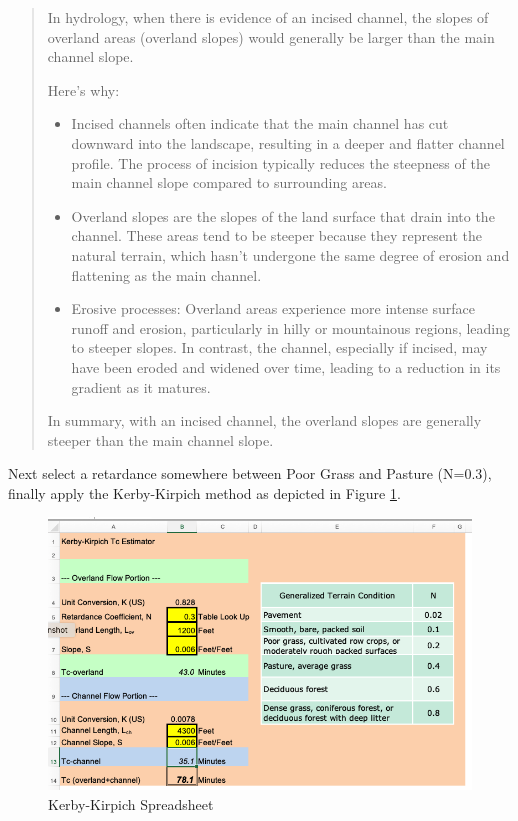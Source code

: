 \documentclass[12pt]{article}
\begin{document}
\begin{enumerate}
\begin{quote}
In hydrology, when there is evidence of an incised channel, the slopes of overland areas (overland slopes) would generally be larger than the main channel slope.

Here's why:

\begin{itemize}
\item Incised channels often indicate that the main channel has cut downward into the landscape, resulting in a deeper and flatter channel profile. The process of incision typically reduces the steepness of the main channel slope compared to surrounding areas.
\item Overland slopes are the slopes of the land surface that drain into the channel. These areas tend to be steeper because they represent the natural terrain, which hasn't undergone the same degree of erosion and flattening as the main channel.
\item Erosive processes: Overland areas experience more intense surface runoff and erosion, particularly in hilly or mountainous regions, leading to steeper slopes. In contrast, the channel, especially if incised, may have been eroded and widened over time, leading to a reduction in its gradient as it matures.
\end{itemize}
In summary, with an incised channel, the overland slopes are generally steeper than the main channel slope.
\end{quote}

Next select a retardance somewhere between Poor Grass and Pasture (N=0.3), finally apply the Kerby-Kirpich method as depicted in Figure \ref{fig:kerby}.

\begin{figure}[h!] %
   \centering
   \includegraphics[width=5.0in]{Kerby.png} 
   \caption{Kerby-Kirpich Spreadsheet}
   \label{fig:kerby}
\end{figure}


\end{enumerate}
\end{document}
